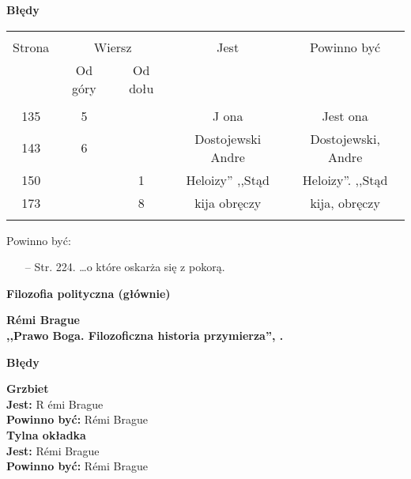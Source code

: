 \documentclass[a4paper,11pt]{article}
\newcommand{\spaceOne}{2em}
\newcommand{\spaceTwo}{1em}
\newcommand{\tb}{\textbf}
\newcommand{\noi}{\noindent}
\newcommand{\Center}[1]{\begin{center} #1 \end{center}}
\newcommand{\CenterTB}[1]{\Center{\tb{#1}}}
\newcommand{\Jest}{\tb{Jest: }}
\newcommand{\Pow}{\tb{Powinno być: }}
\newcommand{\Field}[1]{ \begin{center} {\Large \tb{#1} } \end{center} }
\newcommand{\Work}[1]{ \begin{center} {\large \tb{#1}} \end{center} }
\begin{document}
\CenterTB{Błędy}
\begin{center}
  \begin{tabular}{|c|c|c|c|c|}
    \hline
    & \multicolumn{2}{c|}{} & & \\
    Strona & \multicolumn{2}{c|}{Wiersz}& Jest & Powinno być \\ \cline{2-3}
    & Od góry & Od dołu &  &  \\ \hline
    & & & & \\
    135 & 5 & & J ona & Jest ona \\
    143 & 6 & & Dostojewski Andre & Dostojewski, Andre \\
    150 & & 1 & Heloizy'' ,,Stąd %
           & Heloizy''. ,,Stąd \\ %
    173 & & 8 & kija obręczy & kija, obręczy \\
    & & & & \\ \hline
  \end{tabular}
\end{center}

Powinno być:
\begin{itemize}
\item[--] Str. 224. \ldots o które oskarża się z pokorą.
\end{itemize}



\newpage
\Field{Filozofia polityczna (głównie)}

\vspace{\spaceTwo}



\Work{ R\'{e}mi Brague \\
  ,,Prawo Boga. Filozoficzna historia przymierza'', \cite{Bra14}.}


\CenterTB{Błędy}

\noi
\tb{Grzbiet} \\
\Jest R \'{e}mi {\small Brague} \\
\Pow R\'{e}mi Brague \\
\tb{Tylna okładka} \\
\Jest R\'{e}mi {\small Brague} \\
\Pow R\'{e}mi Brague \\

\vspace{\spaceOne}
\end{document}
